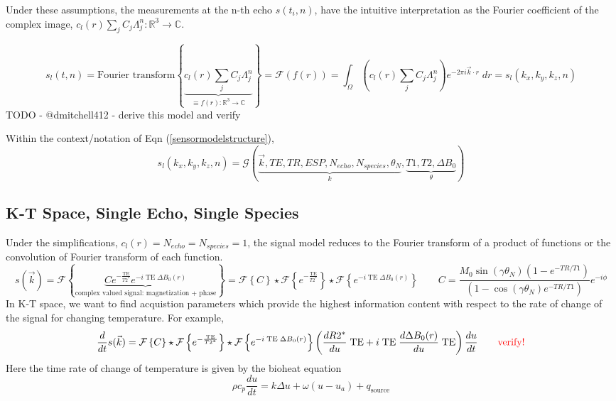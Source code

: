 \documentclass[10pt]{amsart}
\newcommand{\eqn}[1]{(\ref{#1})}
\begin{document}
Under these assumptions, the measurements at the n-th echo $s(t_i,n)$, 
have the intuitive interpretation
as the Fourier coefficient of the complex image, 
$c_l(r) \sum_j C_j \Lambda_j^n : \mathbb{R}^3 \rightarrow \mathbb{C}$.
 
\begin{equation}
\label{FFTmultiecho}
 s_l(t,n) = \text{Fourier transform} \left\{ \underbrace{c_l(r) \sum_j C_j \Lambda_j^n }_{\equiv f(r):\mathbb{R}^3 \rightarrow \mathbb{C} } \right\}
          = \mathcal{F}(f(r))
          = \int_\Omega \left(c_l(r) \sum_j C_j \Lambda_j^n \right)
          e^{-2  \pi i \vec{k}  \cdot r } \; dr
          = s_l(k_x,k_y,k_z,n)
\end{equation}
        {\color{red} TODO - @dmitchell412 - derive this model and verify  }

Within the context/notation of Eqn \eqn{sensormodelstructure},
\[
           s_l(k_x,k_y,k_z,n) =
\mathcal{G}\left(\underbrace{\vec{k},TE,TR,ESP, N_{echo}, N_{species},
\theta_N}_{k}
,\underbrace{T1,T2,\Delta B_0}_\theta\right)
\]

\subsection{K-T Space, Single Echo, Single Species}
Under the simplifications, $ c_l(r) =  N_{echo} =  N_{species} = 1$,
the signal model reduces to  the Fourier transform of a product of functions
or the convolution of Fourier transform of each function.
\[
 s(\vec{k}) =
  \mathcal{F}
   \left\{  
\underbrace{
 C 
e^{- \frac{\text{TE}}{T2^*}   } 
e^{- i\; \text{TE} \; \Delta B_{0}(r) }
}_\text{complex valued signal: magnetization + phase}
   \right\}
    = 
  \mathcal{F} \left\{   C \right\}
   \star
  \mathcal{F} \left\{   e^{- \frac{\text{TE}}{T2^*}   } \right\}
   \star
  \mathcal{F} \left\{   e^{- i\; \text{TE} \; \Delta B_{0}(r) } \right\}
 \qquad
C = \frac{M_{0} \sin \left(\gamma \theta_N \right)\left( 1- e^{-TR/T1}\right)}{\left( 1- \cos \left(\gamma \theta_N \right) e^{-TR/T1}\right)}
e^{-i  \phi} 
\]
{ \color{red}
In K-T space, we want to find acquistion parameters  which provide the
highest information content with respect to the rate of change of the
signal for changing temperature.
} For example,
\[
\frac{d}{dt}
 s(\vec{k}) =
  \mathcal{F} \left\{   C \right\}
   \star
  \mathcal{F} \left\{   e^{- \frac{\text{TE}}{T2^*}   } \right\}
   \star
  \mathcal{F} \left\{   e^{- i\; \text{TE} \; \Delta B_{0}(r) } \right\}
  \left(
  \frac{dR2^*}{du}  \;\text{TE} 
   + 
  i\; \text{TE} \; \frac{d\Delta B_{0}(r) }{du}  \;\text{TE} 
  \right)
\frac{du}{dt}
\qquad 
\text{\color{red}verify!}
\]
Here the time rate of change of temperature is given by the bioheat equation
\[
\rho c_p \frac{du}{dt} =  k \Delta u + \omega(u-u_a) + q_\text{source}
\]
\end{document}
